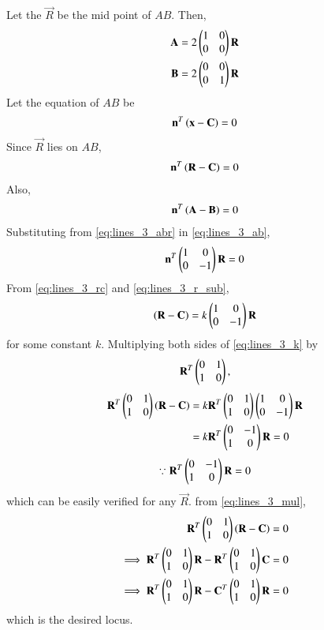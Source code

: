 \documentclass[journal,12pt,twocolumn]{IEEEtran}
\begin{document}
\begin{enumerate}[label=\arabic*]
%
Let the $\vec{R}$ be the mid point of $AB$. Then,
\begin{align}
\label{eq:lines_3_abr}
\mathbf{A} =2 \begin{pmatrix}1 & 0\\0 & 0\end{pmatrix}\mathbf{R} 
\\
\mathbf{B} =2 \begin{pmatrix}0 & 0\\0 & 1\end{pmatrix}\mathbf{R} 
\end{align}
%
Let the equation of $AB$ be 
\begin{align}
\mathbf{n}^T\left(\mathbf{x} - \mathbf{C}\right) = 0
\label{eq:lines_3_def}
\end{align}
Since $\vec{R}$ lies on $AB$, 
\begin{align}
\mathbf{n}^T\left(\mathbf{R} - \mathbf{C}\right) = 0
\label{eq:lines_3_rc}
\end{align}
Also, 
\begin{align}
\mathbf{n}^T\left(\mathbf{A} - \mathbf{B}\right) = 0
\label{eq:lines_3_ab}
\end{align}
%
Substituting from \eqref{eq:lines_3_abr} in \eqref{eq:lines_3_ab},
\begin{align}
\mathbf{n}^T\begin{pmatrix}1 & 0 \\ 0 & -1\end{pmatrix}\mathbf{R} = 0
\label{eq:lines_3_r_sub}
\end{align}
%
From \eqref{eq:lines_3_rc} and \eqref{eq:lines_3_r_sub},
\begin{align}
\left(\mathbf{R} - \mathbf{C}\right) = k\begin{pmatrix}1 & 0 \\ 0 & -1\end{pmatrix}\mathbf{R}
\label{eq:lines_3_k}
\end{align}
%
for some constant $k$.
Multiplying both sides of \eqref{eq:lines_3_k} by 
\begin{align}
\mathbf{R}^T\begin{pmatrix}0 & 1 \\ 1 & 0\end{pmatrix},
\end{align}
\begin{align}
\mathbf{R}^T\begin{pmatrix}0 & 1 \\ 1 & 0\end{pmatrix}\left(\mathbf{R} - \mathbf{C}\right) &= k\mathbf{R}^T\begin{pmatrix}0 & 1 \\ 1 & 0\end{pmatrix}\begin{pmatrix}1 & 0 \\ 0 & -1\end{pmatrix}\mathbf{R}
\nonumber \\
&= k\mathbf{R}^T\begin{pmatrix}0 & -1 \\ 1 & 0\end{pmatrix}\mathbf{R} = 0
\label{eq:lines_3_mul}
\end{align}
\begin{align}
\because \mathbf{R}^T\begin{pmatrix}0 & -1 \\ 1 & 0\end{pmatrix}\mathbf{R} = 0
\end{align}
which can be easily verified for any $\vec{R}$.
%
from \eqref{eq:lines_3_mul},
\begin{align}
\mathbf{R}^T\begin{pmatrix}0 & 1 \\ 1 & 0\end{pmatrix}\left(\mathbf{R} - \mathbf{C}\right) = 0
\nonumber \\
\implies \mathbf{R}^T\begin{pmatrix}0 & 1 \\ 1 & 0\end{pmatrix}\mathbf{R} - \mathbf{R}^T\begin{pmatrix}0 & 1 \\ 1 & 0\end{pmatrix}\mathbf{C} = 0
\nonumber \\
\implies \mathbf{R}^T\begin{pmatrix}0 & 1 \\ 1 & 0\end{pmatrix}\mathbf{R} - \mathbf{C}^T\begin{pmatrix}0 & 1 \\ 1 & 0\end{pmatrix}\mathbf{R} = 0
\end{align}
%
which is the desired locus.
\end{enumerate}
\end{document}

